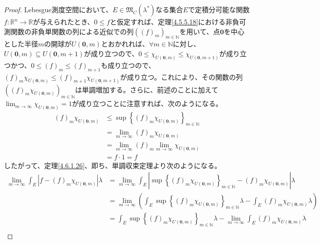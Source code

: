 \documentclass[dvipdfmx]{jsarticle}
\begin{document}
\begin{proof}
Lebesgue測度空間において、$E \in \mathfrak{M}_{C}\left( \lambda^{*} \right)$なる集合$E$で定積分可能な関数$f:\mathbb{R}^{n} \rightarrow \mathbb{R}$が与えられたとき、$0 \leq f$と仮定すれば、定理\ref{4.5.5.18}における非負可測関数の非負単関数の列による近似での列$\left( (f)_{m} \right)_{m \in \mathbb{N}}$を用いて、点$\mathbf{0}$を中心とした半径$m$の開球が$U\left( \mathbf{0},m \right)$とおかれれば、$\forall m \in \mathbb{N}$に対し、$U\left( \mathbf{0},m \right) \subseteq U\left( \mathbf{0},m + 1 \right)$が成り立つので、$0 \leq \chi_{U\left( \mathbf{0},m \right)} \leq \chi_{U\left( \mathbf{0},m + 1 \right)}$が成り立つかつ、$0 \leq (f)_{m} \leq (f)_{m + 1}$も成り立つので、$(f)_{m}\chi_{U\left( \mathbf{0},m \right)} \leq (f)_{m + 1}\chi_{U\left( \mathbf{0},m + 1 \right)}$が成り立つ。これにより、その関数の列$\left( (f)_{m}\chi_{U\left( \mathbf{0},m \right)} \right)_{m \in \mathbb{N}}$は単調増加する。さらに、前述のことに加えて$\lim_{m \rightarrow \infty}\chi_{U\left( \mathbf{0},m \right)} = 1$が成り立つことに注意すれば、次のようになる。
\begin{align*}
(f)_{m}\chi_{U\left( \mathbf{0},m \right)} &\leq \sup\left\{ (f)_{m}\chi_{U\left( \mathbf{0},m \right)} \right\}_{m \in \mathbb{N}}\\
&= \lim_{m \rightarrow \infty}{(f)_{m}\chi_{U\left( \mathbf{0},m \right)}}\\
&= \lim_{m \rightarrow \infty}(f)_{m}\lim_{m \rightarrow \infty}\chi_{U\left( \mathbf{0},m \right)}\\
&= f \cdot 1 = f
\end{align*}
したがって、定理\ref{4.6.1.26}、即ち、単調収束定理より次のようになる。
\begin{align*}
\lim_{m \rightarrow \infty}{\int_{E} {\left| f - (f)_{m}\chi_{U\left( \mathbf{0},m \right)} \right|\lambda}} &= \lim_{m \rightarrow \infty}{\int_{E} {\left| \sup\left\{ (f)_{m}\chi_{U\left( \mathbf{0},m \right)} \right\}_{m \in \mathbb{N}} - (f)_{m}\chi_{U\left( \mathbf{0},m \right)} \right|\lambda}}\\
&= \lim_{m \rightarrow \infty}\left( \int_{E} {\sup\left\{ (f)_{m}\chi_{U\left( \mathbf{0},m \right)} \right\}_{m \in \mathbb{N}}\lambda} - \int_{E} {(f)_{m}\chi_{U\left( \mathbf{0},m \right)}\lambda} \right)\\
&= \int_{E} {\sup\left\{ (f)_{m}\chi_{U\left( \mathbf{0},m \right)} \right\}_{m \in \mathbb{N}}\lambda} - \lim_{m \rightarrow \infty}{\int_{E} {(f)_{m}\chi_{U\left( \mathbf{0},m \right)}\lambda}}\\

\end{align*}
\end{proof}
\end{document}
